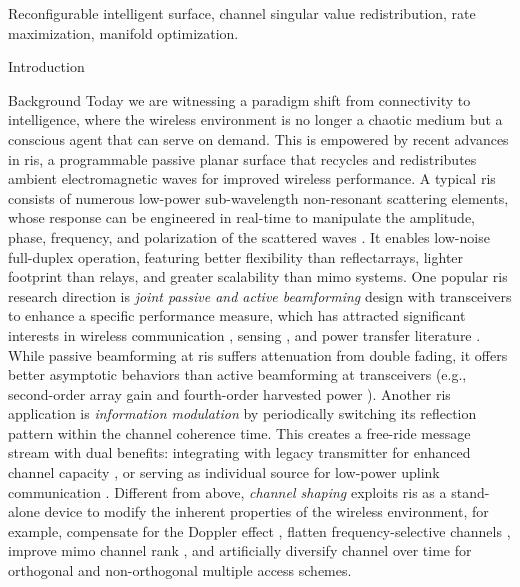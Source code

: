 \begin{IEEEkeywords}
	Reconfigurable intelligent surface, channel singular value redistribution, rate maximization, manifold optimization.
\end{IEEEkeywords}

\glsresetall

\begin{section}{Introduction}
	\begin{subsection}{Background}
		Today we are witnessing a paradigm shift from connectivity to intelligence, where the wireless environment is no longer a chaotic medium but a conscious agent that can serve on demand.
		This is empowered by recent advances in \gls{ris}, a programmable passive planar surface that recycles and redistributes ambient electromagnetic waves for improved wireless performance.
		A typical \gls{ris} consists of numerous low-power sub-wavelength non-resonant scattering elements, whose response can be engineered in real-time to manipulate the amplitude, phase, frequency, and polarization of the scattered waves \cite{Basar2019}.
		It enables low-noise full-duplex operation, featuring better flexibility than reflectarrays, lighter footprint than relays, and greater scalability than \gls{mimo} systems.
		One popular \gls{ris} research direction is \emph{joint passive and active beamforming} design with transceivers to enhance a specific performance measure, which has attracted significant interests in wireless communication \cite{Wu2019,Guo2020,Liu2022}, sensing \cite{He2022,Luo2022,Hua2023}, and power transfer literature \cite{Wu2020a,Feng2022,Zhao2022}.
		While passive beamforming at \gls{ris} suffers attenuation from double fading, it offers better asymptotic behaviors than active beamforming at transceivers (e.g., second-order array gain and fourth-order harvested power \cite{Zhao2022}).
		Another \gls{ris} application is \emph{information modulation} by periodically switching its reflection pattern within the channel coherence time.
		This creates a free-ride message stream with dual benefits: integrating with legacy transmitter for enhanced channel capacity \cite{Karasik2020,Basar2020,Ye2022}, or serving as individual source for low-power uplink communication \cite{Liang2020,Zhao2024,Yang2024}.
		Different from above, \emph{channel shaping} exploits \gls{ris} as a stand-alone device to modify the inherent properties of the wireless environment, for example, compensate for the Doppler effect \cite{Basar2021}, flatten frequency-selective channels \cite{Arslan2022}, improve \gls{mimo} channel rank \cite{Ozdogan2020a}, and artificially diversify channel over time for orthogonal \cite{Yang2019} and non-orthogonal \cite{Chen2023} multiple access schemes.

\end{subsection}
\end{section}
